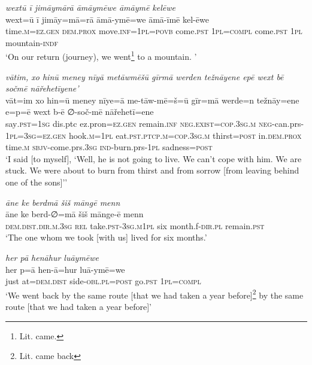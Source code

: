 \ea \label{ZQ.11}
\textit{wextū ī jimāymārā āmāymēwe āmāymē kelēwe} \\ 
\gll wext=ū ī jimāy=mā=rā āmā-ymē=we āmā-īmē kel-ēwe \\ 
 time\textsc{.m}\textsc{=ez.gen} \textsc{dem.prox} move\textsc{.inf}\textsc{=\textsc{1pl}}\textsc{=\textsc{povb}} come\textsc{.pst} \textsc{1pl}\textsc{=compl} come\textsc{.pst} \textsc{1pl} mountain\textsc{-indf} \\ 
\glt `On our return (journey), we went\footnote{Lit. came.}  to a mountain. '
\z 
 
\ea \label{ZQ.25}
\textit{vātim, xo hinū meney nīyā metāwmēšū gīrmā werden težnāyene epē wext bē sočmē nāřehetīyene’} \\ 
\gll vāt=im xo hin=ū meney nīye=ā me-tāw-mē=š=ū gīr=mā werde=n težnāy=ene e=p=ē wext b-ē ∅-soč-mē nāřehetī=ene \\ 
 say\textsc{.pst}\textsc{=\textsc{1sg}} dis.ptc ez.pron\textsc{=ez.gen} remain\textsc{.inf} \textsc{\textsc{neg.}exist}\textsc{=cop}\textsc{.3sg}\textsc{.m} \textsc{neg-}can.prs\textsc{-\textsc{1pl}}\textsc{=3sg}\textsc{=ez.gen} hook\textsc{.m}\textsc{=\textsc{1pl}} eat\textsc{.pst}\textsc{.ptcp}\textsc{.m}\textsc{=cop}\textsc{.3sg}\textsc{.m} thirst\textsc{=\textsc{post}} in.\textsc{dem.prox} time\textsc{.m} \textsc{sbjv-}come.prs\textsc{.3sg} \textsc{ind-}burn.prs\textsc{-\textsc{1pl}} sadness\textsc{=\textsc{post}} \\ 
\glt `I said [to myself], ‘Well, he is not going to live. We can’t cope with him. We are stuck. We were about to burn from thirst and from sorrow [from leaving behind one of the sons]’'
\z 
 
\ea \label{ZQ.29}
\textit{āne ke berdmā šiš māngē menn} \\ 
\gll āne ke berd-∅=mā šiš mānge-ē menn \\ 
 \textsc{dem.dist}\textsc{.dir}\textsc{.m}\textsc{.3sg} \textsc{rel} take\textsc{.pst}\textsc{-3sg}\textsc{.m}\textsc{1pl} six month.f\textsc{-dir}\textsc{.pl} remain\textsc{.pst} \\ 
\glt `The one whom we took [with us] lived for six months.'
\z 
 
\ea \label{ZQ.34}
\textit{her pā henāhur luāymēwe} \\ 
\gll her p=ā hen-ā=hur luā-ymē=we \\ 
 just at=\textsc{dem.dist} side\textsc{-obl}\textsc{.pl}\textsc{=\textsc{post}} go\textsc{.pst} \textsc{1pl}\textsc{=compl} \\ 
\glt `We went back by the same route [that we had taken a year before]\footnote{Lit. came back} by the same route [that we had taken a year before]'
\z 
 
